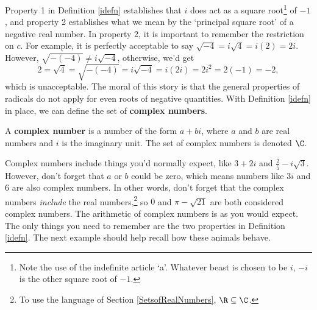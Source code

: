 \documentclass{ximera}
\begin{document}
\medskip

Property 1 in Definition \ref{idefn} establishes that $i$ does act as a square root\footnote{Note the use of the indefinite article `a'.  Whatever beast is chosen to be $i$, $-i$ is the other square root of $-1$.} of $-1$, and property 2 establishes what we mean by the `principal square root' of a negative real number.  In property 2, it is important to remember the restriction on $c$.  For example, it is perfectly acceptable to say  $\sqrt{-4} = i \sqrt{4} = i(2) = 2i$. However, $\sqrt{-(-4)} \neq i \sqrt{-4}$, otherwise, we'd get\[ 2 = \sqrt{4} = \sqrt{-(-4)} = i \sqrt{-4} = i (2i) = 2i^2 = 2(-1) = -2,\] which is unacceptable. The moral of this story is that the general properties of radicals do not apply for even roots of negative quantities.  With Definition \ref{idefn} in place, we can define the set of \textbf{complex numbers}.

\medskip

\colorbox{ResultColor}{\bbm
\begin{defn} \label{complexdefn} A \textbf{complex number} is a number of the form $a+bi$, where $a$ and $b$ are real numbers and $i$ is the imaginary unit.  The set of complex numbers is denoted $\C$.
\end{defn}
\ebm}

\medskip

Complex numbers include things you'd normally expect, like $3+2i$ and $\frac{2}{5} - i\sqrt{3}$.  However, don't forget that $a$ or $b$ could be zero, which means numbers like $3i$ and $6$ are also complex numbers.  In other words, don't forget that the complex numbers \textit{include} the real numbers,\footnote{To use the language  of Section \ref{SetsofRealNumbers}, $\R \subseteq \C$.} so $0$ and $\pi - \sqrt{21}$ are both considered complex numbers.   The arithmetic of complex numbers is as you would expect.  The only things you need to remember are the two properties in Definition \ref{idefn}.  The next example should help recall how these animals behave.

\pagebreak
\end{document}
